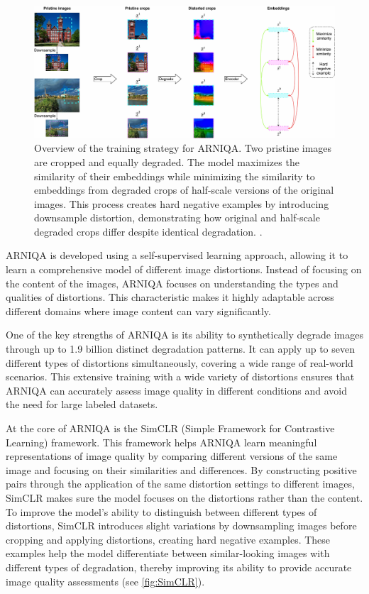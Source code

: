 \begin{figure}[ht]
    \centering
    \includegraphics[keepaspectratio,width=15cm]{img/method_SimCLR.jpg}
    \caption{Overview of the training strategy for ARNIQA. Two pristine images are cropped and equally degraded. The model maximizes the similarity of their embeddings while minimizing the similarity to embeddings from degraded crops of half-scale versions of the original images. This process creates hard negative examples by introducing downsample distortion, demonstrating how original and half-scale degraded crops differ despite identical degradation. \autocite{ARNIQA}.}
    \label{fig:SimCLR}
\end{figure}
\noindent
ARNIQA is developed using a self-supervised learning approach, allowing it to learn a comprehensive model of different image distortions. Instead of focusing on the content of the images, ARNIQA focuses on understanding the types and qualities of distortions. This characteristic makes it highly adaptable across different domains where image content can vary significantly. \par
\vspace{\baselineskip}
\vspace{\baselineskip}
\noindent
One of the key strengths of ARNIQA is its ability to synthetically degrade images through up to 1.9 billion distinct degradation patterns. It can apply up to seven different types of distortions simultaneously, covering a wide range of real-world scenarios. This extensive training with a wide variety of distortions ensures that ARNIQA can accurately assess image quality in different conditions and avoid the need for large labeled datasets. \par
\vspace{\baselineskip}
\noindent
At the core of ARNIQA is the SimCLR (Simple Framework for Contrastive Learning) framework. This framework helps ARNIQA learn meaningful representations of image quality by comparing different versions of the same image and focusing on their similarities and differences. By constructing positive pairs through the application of the same distortion settings to different images, SimCLR makes sure the model focuses on the distortions rather than the content. To improve the model’s ability to distinguish between different types of distortions, SimCLR introduces slight variations by downsampling images before cropping and applying distortions, creating hard negative examples. These examples help the model differentiate between similar-looking images with different types of degradation, thereby improving its ability to provide accurate image quality assessments (see \autoref{fig:SimCLR}). \par
